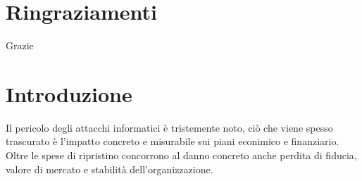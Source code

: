 \documentclass[12pt,a4paper,openright,twoside]{report}
\begin{document}

\restoregeometry




\clearpage{\pagestyle{empty}\cleardoublepage}
\chapter*{Ringraziamenti}
{}
Grazie

\clearpage{\pagestyle{empty}\cleardoublepage}



\tableofcontents %
\rhead[\fancyplain{}{\bfseries\leftmark}]{\fancyplain{}{\bfseries\thepage}}



\clearpage{\pagestyle{empty}\cleardoublepage}
\renewcommand{\listfigurename}{Elenco delle Figure}
{}
\listoffigures %



\clearpage{\pagestyle{empty}\cleardoublepage}
\renewcommand{\listtablename}{Elenco delle Tabelle}
{}
\listoftables %



\clearpage{\pagestyle{empty}\cleardoublepage}
\chapter{Introduzione} 
\lhead[\fancyplain{}{\bfseries\thepage}]{\fancyplain{}{\bfseries\rightmark}}
Il pericolo degli attacchi informatici \`e tristemente noto, ci\`o che viene spesso trascurato \`e l'impatto concreto e 
misurabile sui piani econimico e finanziario. Oltre le spese di ripristino concorrono al danno concreto anche perdita di 
fiducia, valore di mercato e stabilit\`a dell'organizzazione.\\
\end{document}
